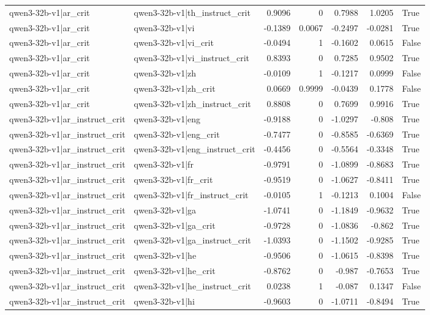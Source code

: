 \begin{table}
\begin{tabular}{l l r r r r l}
qwen3-32b-v1|ar_crit & qwen3-32b-v1|th_instruct_crit & 0.9096 & 0 & 0.7988 & 1.0205 & True \\
qwen3-32b-v1|ar_crit & qwen3-32b-v1|vi & -0.1389 & 0.0067 & -0.2497 & -0.0281 & True \\
qwen3-32b-v1|ar_crit & qwen3-32b-v1|vi_crit & -0.0494 & 1 & -0.1602 & 0.0615 & False \\
qwen3-32b-v1|ar_crit & qwen3-32b-v1|vi_instruct_crit & 0.8393 & 0 & 0.7285 & 0.9502 & True \\
qwen3-32b-v1|ar_crit & qwen3-32b-v1|zh & -0.0109 & 1 & -0.1217 & 0.0999 & False \\
qwen3-32b-v1|ar_crit & qwen3-32b-v1|zh_crit & 0.0669 & 0.9999 & -0.0439 & 0.1778 & False \\
qwen3-32b-v1|ar_crit & qwen3-32b-v1|zh_instruct_crit & 0.8808 & 0 & 0.7699 & 0.9916 & True \\
qwen3-32b-v1|ar_instruct_crit & qwen3-32b-v1|eng & -0.9188 & 0 & -1.0297 & -0.808 & True \\
qwen3-32b-v1|ar_instruct_crit & qwen3-32b-v1|eng_crit & -0.7477 & 0 & -0.8585 & -0.6369 & True \\
qwen3-32b-v1|ar_instruct_crit & qwen3-32b-v1|eng_instruct_crit & -0.4456 & 0 & -0.5564 & -0.3348 & True \\
qwen3-32b-v1|ar_instruct_crit & qwen3-32b-v1|fr & -0.9791 & 0 & -1.0899 & -0.8683 & True \\
qwen3-32b-v1|ar_instruct_crit & qwen3-32b-v1|fr_crit & -0.9519 & 0 & -1.0627 & -0.8411 & True \\
qwen3-32b-v1|ar_instruct_crit & qwen3-32b-v1|fr_instruct_crit & -0.0105 & 1 & -0.1213 & 0.1004 & False \\
qwen3-32b-v1|ar_instruct_crit & qwen3-32b-v1|ga & -1.0741 & 0 & -1.1849 & -0.9632 & True \\
qwen3-32b-v1|ar_instruct_crit & qwen3-32b-v1|ga_crit & -0.9728 & 0 & -1.0836 & -0.862 & True \\
qwen3-32b-v1|ar_instruct_crit & qwen3-32b-v1|ga_instruct_crit & -1.0393 & 0 & -1.1502 & -0.9285 & True \\
qwen3-32b-v1|ar_instruct_crit & qwen3-32b-v1|he & -0.9506 & 0 & -1.0615 & -0.8398 & True \\
qwen3-32b-v1|ar_instruct_crit & qwen3-32b-v1|he_crit & -0.8762 & 0 & -0.987 & -0.7653 & True \\
qwen3-32b-v1|ar_instruct_crit & qwen3-32b-v1|he_instruct_crit & 0.0238 & 1 & -0.087 & 0.1347 & False \\
qwen3-32b-v1|ar_instruct_crit & qwen3-32b-v1|hi & -0.9603 & 0 & -1.0711 & -0.8494 & True \\

\end{tabular}
\end{table}
